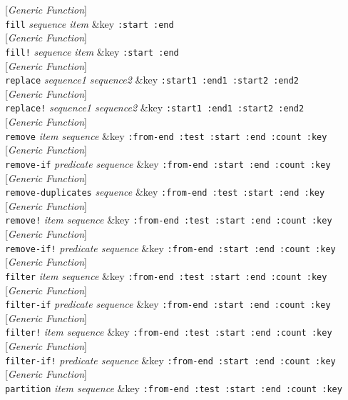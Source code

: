 \documentclass[10pt]{book}
\newenvironment{defother}[2]{[\textit{#1}]\\\texttt{#2}}{\\}
\newenvironment{defgeneric}[1]{\begin{defother}{Generic Function}{#1}}{\end{defother}}
\begin{document}
\begin{defgeneric}{fill} \textit{sequence item} \&key \texttt{:start :end}\end{defgeneric}
\begin{defgeneric}{fill!} \textit{sequence item} \&key \texttt{:start :end}\end{defgeneric}
\begin{defgeneric}{replace} \textit{sequence1 sequence2} \&key \texttt{:start1 :end1 :start2 :end2}\end{defgeneric}
\begin{defgeneric}{replace!} \textit{sequence1 sequence2} \&key \texttt{:start1 :end1 :start2 :end2}\end{defgeneric}
\begin{defgeneric}{remove} \textit{item sequence} \&key \texttt{:from-end :test :start :end :count :key}\end{defgeneric}
\begin{defgeneric}{remove-if} \textit{predicate sequence} \&key \texttt{:from-end :start :end :count :key}\end{defgeneric}
\begin{defgeneric}{remove-duplicates} \textit{sequence} \&key \texttt{:from-end :test :start :end :key}\end{defgeneric}
\begin{defgeneric}{remove!} \textit{item sequence} \&key \texttt{:from-end :test :start :end :count :key}\end{defgeneric}
\begin{defgeneric}{remove-if!} \textit{predicate sequence} \&key \texttt{:from-end :start :end :count :key}\end{defgeneric}
\begin{defgeneric}{filter} \textit{item sequence} \&key \texttt{:from-end :test :start :end :count :key}\end{defgeneric}
\begin{defgeneric}{filter-if} \textit{predicate sequence} \&key \texttt{:from-end :start :end :count :key}\end{defgeneric}
\begin{defgeneric}{filter!} \textit{item sequence} \&key \texttt{:from-end :test :start :end :count :key}\end{defgeneric}
\begin{defgeneric}{filter-if!} \textit{predicate sequence} \&key \texttt{:from-end :start :end :count :key}\end{defgeneric}
\begin{defgeneric}{partition} \textit{item sequence} \&key \texttt{:from-end :test :start :end :count :key}\end{defgeneric}
\end{document}
